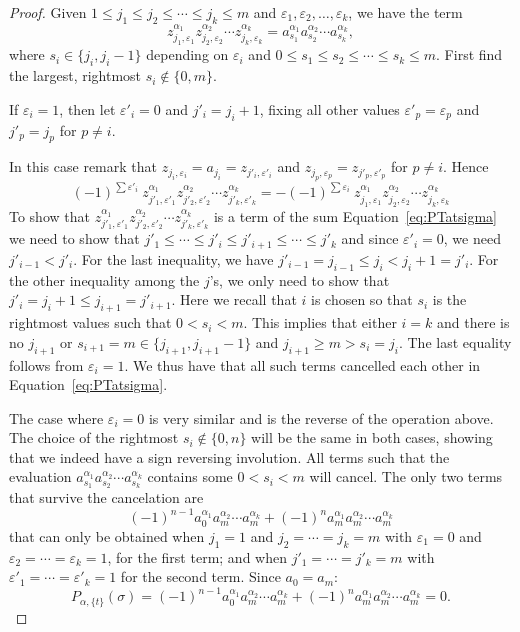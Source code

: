 \documentclass[12pt]{amsart}
\theoremstyle{definition}
\theoremstyle{remark}
\numberwithin{equation}{section}
\renewcommand{\epsilon}{\varepsilon}
\begin{document}
\begin{proof}
Given $1\le j_1\le j_2\le\cdots\le j_k\le m$ and $\epsilon_1,\epsilon_2,\ldots,\epsilon_k$, we have the term 
$$z_{j_1,\epsilon_1}^{\alpha_1}z_{j_2,\epsilon_2}^{\alpha_2} \cdots z_{j_k,\epsilon_k}^{\alpha_k}=a_{s_1}^{\alpha_1}a_{s_2}^{\alpha_2}\cdots a_{s_k}^{\alpha_k},$$
where $s_i\in\{j_i,j_i-1\}$ depending on  $\epsilon_i$ and  $0\le s_1\le s_2\le \cdots\le s_k\le m$. First find the largest, rightmost $s_i\not\in\{0,m\}$. 

\medskip
\noindent
If $\epsilon_i=1$, then let $\epsilon'_i=0$ and $j'_i=j_i+1$, fixing all other values $\epsilon'_p=\epsilon_p$ and $j'_p=j_p$ for $p\not= i$.

\medskip
In this case remark that $z_{j_i,\epsilon_i}=a_{j_i}=z_{j'_i,\epsilon'_i}$ and $z_{j_p,\epsilon_p}=z_{j'_p,\epsilon'_p}$ for  $p\not= i$. Hence
 $$ (-1)^{\sum \epsilon'_i}\ z_{j'_1,\epsilon'_1}^{\alpha_1}z_{j'_2,\epsilon'_2}^{\alpha_2} \cdots z_{j'_k,\epsilon'_k}^{\alpha_k}
  = - (-1)^{\sum \epsilon_i}\ z_{j_1,\epsilon_1}^{\alpha_1}z_{j_2,\epsilon_2}^{\alpha_2} \cdots z_{j_k,\epsilon_k}^{\alpha_k}$$
 To show that $z_{j'_1,\epsilon'_1}^{\alpha_1}z_{j'_2,\epsilon'_2}^{\alpha_2} \cdots z_{j'_k,\epsilon'_k}^{\alpha_k}$ is a term of the sum Equation~\eqref{eq:PTatsigma}
 we need to show that $j'_1\le\cdots\le j'_{i}\le j'_{i+1}\le\cdots\le j'_{k}$ and since $\epsilon'_i=0$, we need $j'_{i-1}<j'_i$.
 For the last inequality, we have $j'_{i-1}=j_{i-1}\le j_i<j_i+1=j'_i$. For the other inequality among the $j$'s, we only need to show that $j'_{i}=j_i+1\le j_{i+1}= j'_{i+1}$.
 Here we recall that $i$ is chosen so that $s_i$ is the rightmost values such that $0<s_i<m$. This implies that either $i=k$ and there is no $j_{i+1}$ or $s_{i+1}=m\in\{j_{i+1},j_{i+1}-1\}$
 and $j_{i+1}\ge m >s_i=j_i$. The last equality follows from $\epsilon_i=1$. We thus have that all such terms cancelled each other in Equation~\eqref{eq:PTatsigma}.
 
 The case where $\epsilon_i=0$ is very similar and is the reverse of the operation above. The choice of the rightmost $s_i\not\in\{0,n\}$ will be the same in both cases, showing that we indeed
 have a sign reversing involution. All terms such that the evaluation $a_{s_1}^{\alpha_1}a_{s_2}^{\alpha_2}\cdots a_{s_k}^{\alpha_k}$ contains some $0<s_i<m$ will cancel.
 The only two terms that survive the cancelation are
 $$(-1)^{n-1}a_{0}^{\alpha_1}a_{m}^{\alpha_2}\cdots a_{m}^{\alpha_k}+  (-1)^n a_{m}^{\alpha_1}a_{m}^{\alpha_2}\cdots a_{m}^{\alpha_k}$$
 that can only be obtained when $j_1=1$ and $j_2=\cdots=j_k=m$ with $\epsilon_1=0$ and $\epsilon_2=\cdots=\epsilon_k=1$, for the first term;
 and when $j'_1=\cdots=j'_k=m$ with $\epsilon'_1=\cdots=\epsilon'_k=1$ for the second term. Since $a_0=a_m$:
  $$P_{\alpha,\{t\}}(\sigma)=(-1)^{n-1}a_{0}^{\alpha_1}a_{m}^{\alpha_2}\cdots a_{m}^{\alpha_k}+  (-1)^n a_{m}^{\alpha_1}a_{m}^{\alpha_2}\cdots a_{m}^{\alpha_k}=0.$$



\end{proof}
\end{document}
